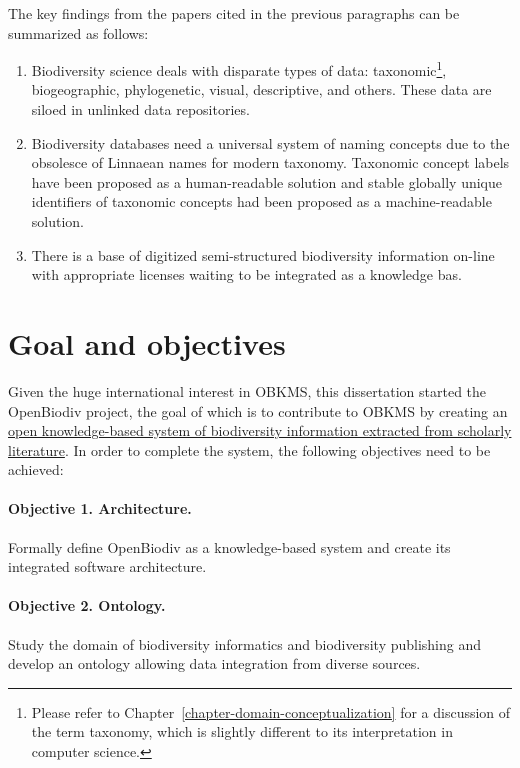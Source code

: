 The key findings from the papers cited in the previous paragraphs can be summarized as follows:

\begin{enumerate}
  
\item{Biodiversity science deals with disparate types of data: taxonomic\footnote{Please refer to Chapter~\ref{chapter-domain-conceptualization} for a discussion of the term taxonomy, which is slightly different to its interpretation in computer science.}, biogeographic, phylogenetic, visual, descriptive, and others. These data are siloed in unlinked data repositories.}
  
\item{Biodiversity databases need a universal system of naming concepts due to the obsolesce of Linnaean names for modern taxonomy. Taxonomic concept labels have been proposed as a human-readable solution and stable globally unique identifiers of taxonomic concepts had been proposed as a machine-readable solution.}

\item{There is a base of digitized semi-structured biodiversity information on-line with appropriate licenses waiting to be integrated as a knowledge bas.}
\end{enumerate}


\section*{Goal and objectives}

Given the huge international interest in OBKMS, this dissertation started the OpenBiodiv project, the goal of which is to contribute to OBKMS by creating an \ul{open knowledge-based system of biodiversity information extracted from scholarly literature}. In order to complete the system, the following objectives need to be achieved:

\paragraph{Objective 1. Architecture.} Formally define OpenBiodiv as a knowledge-based system and create its integrated software architecture.
\paragraph{Objective 2. Ontology.} Study the domain of biodiversity informatics and biodiversity publishing and develop an ontology allowing data integration from diverse sources.
